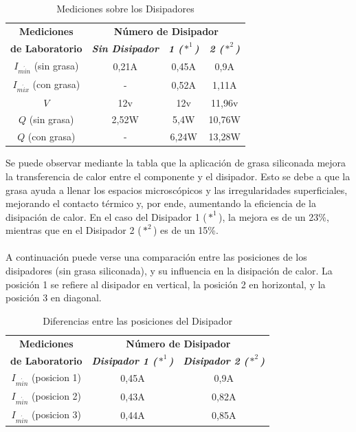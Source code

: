 \documentclass[conference]{IEEEtran}
\begin{document}
\begin{table}[htbp]
    \caption{Mediciones sobre los Disipadores}
    \begin{center}
    \begin{tabular}{|c|c|c|c|}
    \hline
    \textbf{Mediciones} & \multicolumn{3}{|c|}{\textbf{Número de Disipador}} \\
    \cline{2-4} 
    \textbf{de Laboratorio} & \textbf{\textit{Sin Disipador}} & \textbf{\textit{1 ($*^1$)}} & \textbf{\textit{2 ($*^2$)}} \\
    \hline
    $I_{m\acute{i}n}$ (sin grasa) & 0,21A & 0,45A & 0,9A \\
    \hline
    $I_{m\acute{i}x}$ (con grasa) & - & 0,52A & 1,11A \\
    \hline
    $V$ & 12v & 12v & 11,96v \\
    \hline
    $Q$ (sin grasa) & 2,52W & 5,4W & 10,76W \\
    \hline
    $Q$ (con grasa) & - & 6,24W & 13,28W \\
    \hline
    \end{tabular}
    \label{tab1}
    \end{center}
    \end{table}

    Se puede observar mediante la tabla que la aplicación de grasa siliconada mejora la transferencia de calor entre el 
    componente y el disipador. Esto se debe a que la grasa ayuda a llenar los espacios microscópicos y las irregularidades 
    superficiales, mejorando el contacto térmico y, por ende, aumentando la eficiencia de la disipación de calor. En el caso
    del Disipador 1 ($*^1$), la mejora es de un 23\%, mientras que en el Disipador 2 ($*^2$) es de un 15\%.\\ \\
    A continuación puede verse una comparación entre las posiciones de los disipadores (sin grasa siliconada), y su 
    influencia en la disipación de calor. La posición 1 se refiere al disipador en vertical, la posición 2 en 
    horizontal, y la posición 3 en diagonal.

    \begin{table}[htbp]
        \caption{Diferencias entre las posiciones del Disipador}
        \begin{center}
        \begin{tabular}{|c|c|c|}
        \hline
        \textbf{Mediciones} & \multicolumn{2}{c|}{\textbf{Número de Disipador}} \\
        \cline{2-3}
        \textbf{de Laboratorio} & \textbf{\textit{Disipador 1 ($*^1$)}} & \textbf{\textit{Disipador 2 ($*^2$)}} \\
        \hline
        $I_{m\acute{i}n}$ (posicion 1) & 0,45A & 0,9A \\
        \hline
        $I_{m\acute{i}n}$ (posicion 2) & 0,43A & 0,82A \\
        \hline
        $I_{m\acute{i}n}$ (posicion 3) & 0,44A & 0,85A \\
        \hline
        
        \end{tabular}
        \label{tab1}
        \end{center}
    \end{table}
\end{document}

